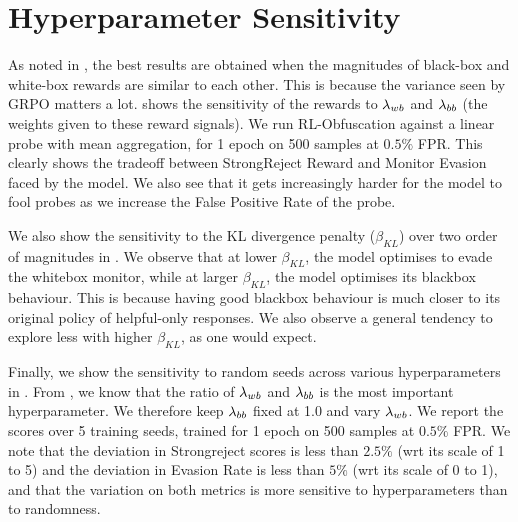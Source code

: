 \section{Hyperparameter Sensitivity}
\label{sec:hparam_sweeps}
As noted in , the best results are obtained when the magnitudes of black-box and white-box rewards are similar to each other. This is because the variance seen by GRPO matters a lot.  shows the sensitivity of the rewards to $\lambda_{wb}$ and $\lambda_{bb}$ (the weights given to these reward signals). We run RL-Obfuscation against a linear probe with mean aggregation, for 1 epoch on 500 samples at $0.5\%$ FPR. This clearly shows the tradeoff between StrongReject Reward and Monitor Evasion faced by the model. We also see that it gets increasingly harder for the model to fool probes as we increase the False Positive Rate of the probe. 

We also show the sensitivity to the KL divergence penalty ($\beta_{KL}$) over two order of magnitudes in . We observe that at lower $\beta_{KL}$, the model optimises to evade the whitebox monitor, while at larger $\beta_{KL}$, the model optimises its blackbox behaviour. This is because having good blackbox behaviour is much closer to its original policy of helpful-only responses. We also observe a general tendency to explore less with higher $\beta_{KL}$, as one would expect.

Finally, we show the sensitivity to random seeds across various hyperparameters in . From , we know that the ratio of $\lambda_{wb}$ and $\lambda_{bb}$ is the most important hyperparameter. We therefore keep $\lambda_{bb}$ fixed at 1.0 and vary $\lambda_{wb}$. We report the scores over 5 training seeds, trained for 1 epoch on 500 samples at $0.5\%$ FPR. We note that the deviation in Strongreject scores is less than $2.5\%$ (wrt its scale of 1 to 5) and the deviation in Evasion Rate is less than $5\%$ (wrt its scale of 0 to 1), and that the variation on both metrics is more sensitive to hyperparameters than to randomness. 

